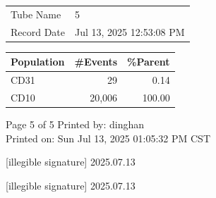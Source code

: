 \documentclass[UTF8,10pt,a4paper,fontset=fandol]{ctexart}
\newcommand{\fieldvalue}[1]{#1}
\newcommand{\handwritten}[1]{#1}
\begin{document}
\begin{center}
\small
\begin{tabularx}{0.58\textwidth}{@{}lX@{}}
\hline
Tube Name &
\fieldvalue{5} \\

Record Date &
\fieldvalue{Jul 13, 2025 12:53:08 PM} \\
\hline
\end{tabularx}

\vspace{0.25em}

\begin{tabularx}{0.58\textwidth}{@{}lrr@{}}
\hline
Population & \#Events & \%Parent \\
\hline
CD31 &
\fieldvalue{29} &
\fieldvalue{0.14} \\

CD10 &
\fieldvalue{20,006} &
\fieldvalue{100.00} \\
\hline
\end{tabularx}
\end{center}

\vfill

\begin{center}
\scriptsize
Page 5 of 5 \hspace{3em} Printed by: dinghan\\
Printed on: Sun Jul 13, 2025 01:05:32 PM CST
\end{center}

\begin{flushright}
\handwritten{[illegible signature]}
\hspace{1em}
\handwritten{2025.07.13}

\vspace{0.5em}

\handwritten{[illegible signature]}
\hspace{1em}
\handwritten{2025.07.13}
\end{flushright}
\end{document}
